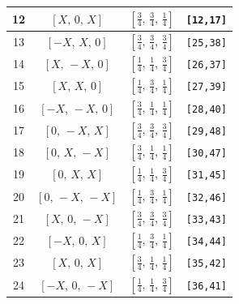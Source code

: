 \documentclass[fleqn,8pt]{jsarticle}
\begin{document}
\begin{longtable}{cccc}
12 & $\left[ X,\, 0,\, X \right]$ & $\left[ \frac{3}{4},\, \frac{3}{4},\, \frac{1}{4} \right]$ & {\tt [12,17]} \\ \hline
13 & $\left[ - X,\, X,\, 0 \right]$ & $\left[ \frac{3}{4},\, \frac{3}{4},\, \frac{3}{4} \right]$ & {\tt [25,38]} \\ \hline
14 & $\left[ X,\, - X,\, 0 \right]$ & $\left[ \frac{1}{4},\, \frac{1}{4},\, \frac{3}{4} \right]$ & {\tt [26,37]} \\ \hline
15 & $\left[ X,\, X,\, 0 \right]$ & $\left[ \frac{1}{4},\, \frac{3}{4},\, \frac{1}{4} \right]$ & {\tt [27,39]} \\ \hline
16 & $\left[ - X,\, - X,\, 0 \right]$ & $\left[ \frac{3}{4},\, \frac{1}{4},\, \frac{1}{4} \right]$ & {\tt [28,40]} \\ \hline
17 & $\left[ 0,\, - X,\, X \right]$ & $\left[ \frac{3}{4},\, \frac{3}{4},\, \frac{3}{4} \right]$ & {\tt [29,48]} \\ \hline
18 & $\left[ 0,\, X,\, - X \right]$ & $\left[ \frac{3}{4},\, \frac{1}{4},\, \frac{1}{4} \right]$ & {\tt [30,47]} \\ \hline
19 & $\left[ 0,\, X,\, X \right]$ & $\left[ \frac{1}{4},\, \frac{1}{4},\, \frac{3}{4} \right]$ & {\tt [31,45]} \\ \hline
20 & $\left[ 0,\, - X,\, - X \right]$ & $\left[ \frac{1}{4},\, \frac{3}{4},\, \frac{1}{4} \right]$ & {\tt [32,46]} \\ \hline
21 & $\left[ X,\, 0,\, - X \right]$ & $\left[ \frac{3}{4},\, \frac{3}{4},\, \frac{3}{4} \right]$ & {\tt [33,43]} \\ \hline
22 & $\left[ - X,\, 0,\, X \right]$ & $\left[ \frac{1}{4},\, \frac{3}{4},\, \frac{1}{4} \right]$ & {\tt [34,44]} \\ \hline
23 & $\left[ X,\, 0,\, X \right]$ & $\left[ \frac{3}{4},\, \frac{1}{4},\, \frac{1}{4} \right]$ & {\tt [35,42]} \\ \hline
24 & $\left[ - X,\, 0,\, - X \right]$ & $\left[ \frac{1}{4},\, \frac{1}{4},\, \frac{3}{4} \right]$ & {\tt [36,41]} \\
\end{longtable}
\renewcommand{\arraystretch}{1.2}
\end{document}
